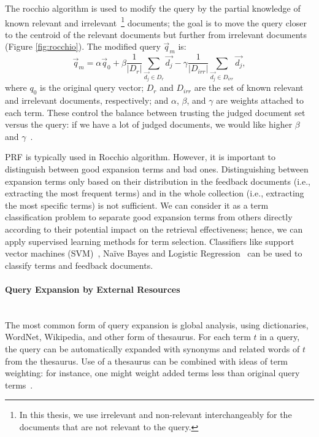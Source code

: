 The rocchio algorithm is used to modify the query by the partial knowledge of known relevant and irrelevant~\footnote{In this thesis, we use irrelevant and non-relevant interchangeably for the documents that are not relevant to the query.} documents; the goal is to move the query closer to the centroid of the relevant documents but further from irrelevant documents (Figure \ref{fig:rocchio}). The modified query $ \vec{q}_m $ is:
\begin{equation}
\label{eq:rocchio}
 \vec{q}_{m} = \alpha  \vec{q}_{0} + \beta\frac{1}{|D_{r}|}\sum\limits_{\vec{d_{j}}\in D_{r}} \vec{d_{j}} - \gamma\frac{1}{|D_{irr}|}\sum\limits_{\vec{d_{j}}\in D_{irr}} \vec{d_{j}},
  \end{equation}
where $ q_{0} $ is the original query vector; $ D_{r} $ and $ D_{irr} $ are the set of known relevant and irrelevant documents, respectively; and $ \alpha $, $ \beta $, and $ \gamma $ are weights attached to each term. These control the balance between trusting the judged document set versus the query: if we have a lot of judged documents, we
would like higher $ \beta $ and $ \gamma $~\citep{manning2008introduction}. 

PRF is typically used in Rocchio algorithm. However, it is important to distinguish between good expansion terms and bad ones. Distinguishing between expansion terms only based on their distribution in the feedback documents (i.e., extracting the most frequent terms) and in the whole collection (i.e., extracting the most specific terms) is not sufficient. We can consider it as a term classification problem to separate good expansion terms from others directly according to their potential impact on the retrieval effectiveness; hence, we can apply supervised learning methods for term selection. Classifiers like support vector machines (SVM)~\citep{cao2008selecting}, Na\"ive Bayes and Logistic Regression~\citep{he2009finding} can be used to classify terms and feedback documents.  
\paragraph{Query Expansion by External Resources}
\ \\
The most common form of query expansion is global analysis, using dictionaries, WordNet, Wikipedia, and other form of thesaurus. For each term $ t $ in a query, the query can be automatically expanded with synonyms and related words of $ t $ from the thesaurus. Use of a thesaurus can be combined with ideas of term weighting: for instance, one might weight added terms less than original query terms~\citep{manning2008introduction}.